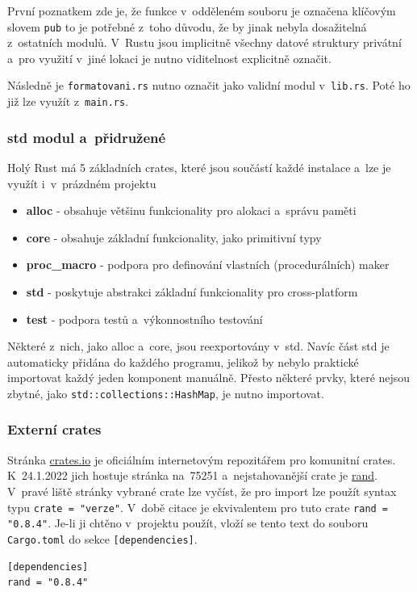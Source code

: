\documentclass[a4paper, 12pt, twoside]{article} %
\newcommand{\rust}[1]{\texttt{#1}}
\begin{document}
		První poznatkem zde je, že funkce v~odděleném souboru je označena klíčovým slovem \texttt{pub} to je potřebné z~toho důvodu, že by jinak nebyla dosažitelná z~ostatních modulů. V~Rustu jsou implicitně všechny datové struktury privátní a~pro využití v~jiné lokaci je nutno viditelnost explicitně označit.
		
		Následně je \texttt{formatovani.rs} nutno označit jako validní modul v~\texttt{lib.rs}. Poté ho již lze využít z~\texttt{main.rs}.
		
		\subsubsection*{std modul a~přidružené}
			Holý Rust má 5 základních crates, které jsou součástí každé instalace a~lze je využít i~v~prázdném projektu
			\begin{itemize}
				\item \textbf{alloc} - obsahuje většinu funkcionality pro alokaci a~správu paměti
				\item \textbf{core} - obsahuje základní funkcionality, jako primitivní typy
				\item \textbf{proc\_macro} - podpora pro definování vlastních (procedurálních) maker
				\item \textbf{std} - poskytuje abstrakci základní funkcionality pro cross-platform
				\item \textbf{test} - podpora testů a~výkonnostního testování
			\end{itemize}

			Některé z~nich, jako alloc a~core, jsou reexportovány v~std. Navíc část std je automaticky přidána do každého programu, jelikož by nebylo praktické importovat každý jeden komponent manuálně. Přesto některé prvky, které nejsou zbytné, jako \rust{std::collections::HashMap}, je nutno importovat.

		\subsubsection*{Externí crates}
			Stránka \href{https://crates.io/}{crates.io} je oficiálním internetovým repozitářem pro komunitní crates. K~24.1.2022 jich hostuje stránka na~75251 a~nejstahovanější crate je \href{https://crates.io/crates/rand}{rand}. V~pravé liště stránky vybrané crate lze vyčíst, že pro import lze použít syntax typu \texttt{crate = "verze"}. V~době citace je ekvivalentem pro tuto crate \texttt{rand = "0.8.4"}. Je-li ji chtěno v~projektu použít, vloží se tento text do souboru \texttt{Cargo.toml} do sekce \texttt{[dependencies]}.
			\begin{verbatim}
[dependencies]
rand = "0.8.4"
			\end{verbatim}
		
\end{document}
